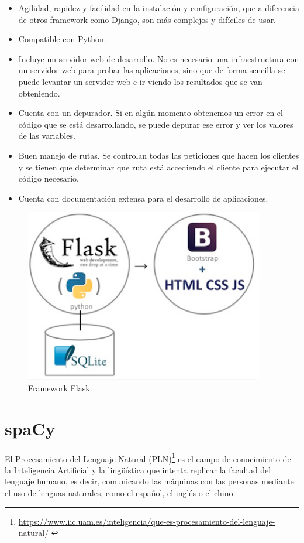 \begin{itemize}
	\item Agilidad, rapidez y facilidad en la instalación y configuración, que a diferencia de otros framework como Django, son más complejos y difíciles de usar.
	\item Compatible con Python.
	\item Incluye un servidor web de desarrollo. No es necesario una infraestructura con un servidor web para probar las aplicaciones, sino que de forma sencilla se puede levantar un servidor web e ir viendo los resultados que se van obteniendo.
	\item Cuenta con un depurador. Si en algún momento obtenemos un error en el código que se está desarrollando, se puede depurar ese error y ver los valores de las variables.
	\item Buen manejo de rutas. Se controlan todas las peticiones que hacen los clientes y se tienen que determinar que ruta está accediendo el cliente para ejecutar el código necesario.
	\item Cuenta con documentación extensa para el desarrollo de aplicaciones.
\end{itemize}

\begin{figure}[h!]
	\centering
	
	
	\includegraphics[scale=0.9]{Imagenes/Figuras/Flask}
	
	
	\caption{Framework Flask.}
	\label{fig:entornoFlask}
\end{figure}


\section{spaCy}\label{sec:spacy}

El Procesamiento del Lenguaje Natural (PLN)\footnote{\href{https://www.iic.uam.es/inteligencia/que-es-procesamiento-del-lenguaje-natural/ }{https://www.iic.uam.es/inteligencia/que-es-procesamiento-del-lenguaje-natural/ }} es el campo de conocimiento de la Inteligencia Artificial y la lingüística que intenta replicar la facultad del lenguaje humano, es decir, comunicando las máquinas con las personas mediante el uso de lenguas naturales, como el español, el inglés o el chino.

